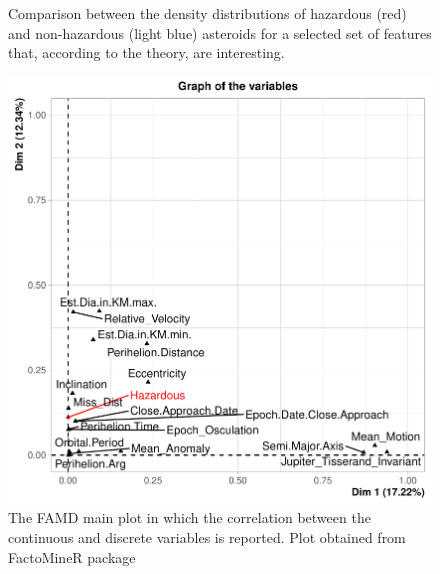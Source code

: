 \documentclass[12pt,%
               a4paper,%
               oneside,openany,%
               titlepage,%
               headinclude,footinclude,%
               BCOR5mm,%
               cleardoublepage=empty,%
               tablecaptionabove,%
               floatperchapter,
               ]{scrreprt}                 %
\begin{document}
\begin{figure}[ht]
\begin{minipage}[b]{0.5\linewidth}
    \vspace{4ex}
  \end{minipage}
\caption{Comparison between the density distributions of hazardous (red) and non-hazardous (light blue) asteroids for a selected set of features that, according to the theory, are interesting.}
\label{Density_relevant}
\end{figure}


\begin{figure}[h]
\begin{center}
\includegraphics[width=1\textwidth]{Figures/FAMD.pdf}
\caption{The FAMD main plot in which the correlation between the continuous and discrete variables is reported. Plot obtained from FactoMineR package \cite{le2008factominer}}
\label{FADM}
\end{center}
\end{figure}
\end{document}
